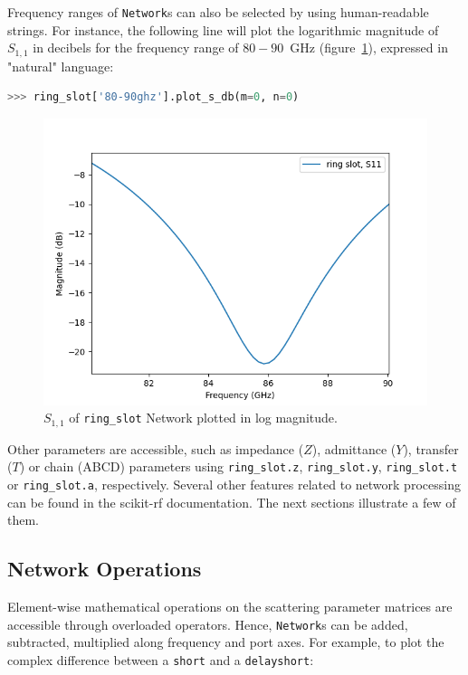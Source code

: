 \documentclass[journal, onecolumn]{IEEEtran}
\begin{document}
Frequency ranges of \texttt{Network}s can also be selected by using human-readable strings. For instance, the following line will plot the logarithmic magnitude of $S_{1,1}$ in decibels for the frequency range of $80-90$~GHz (figure~\ref{fig:figure2}), expressed in "natural" language:

\begin{lstlisting}[language=Python]
>>> ring_slot['80-90ghz'].plot_s_db(m=0, n=0)
\end{lstlisting}

\begin{figure}
	\centering
	\includegraphics[width=0.95\linewidth]{figures/figure2}
	\caption{$S_{1,1}$ of \texttt{ring\_slot} Network plotted in log magnitude.}
	\label{fig:figure2}
\end{figure}

Other parameters are accessible, such as impedance ($Z$), admittance ($Y$), transfer ($T$) or chain (ABCD) parameters using \texttt{ring\_slot.z}, \texttt{ring\_slot.y}, \texttt{ring\_slot.t} or \texttt{ring\_slot.a}, respectively. Several other features related to network processing can be found in the scikit-rf documentation. The next sections illustrate a few of them. 

\subsection{Network Operations}
Element-wise mathematical operations on the scattering parameter matrices are accessible through overloaded operators. Hence, \texttt{Network}s can be added, subtracted, multiplied along frequency and port axes. For example, to plot the complex difference between a \texttt{short} and a \texttt{delayshort}:
\end{document}
